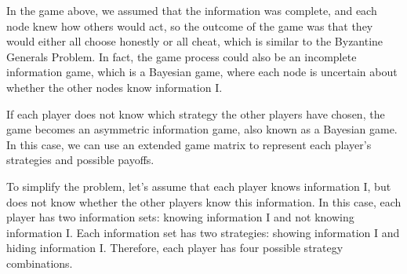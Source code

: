 \documentclass[twocolumn]{article}
\begin{document}
In the game above, we assumed that the information was complete, and each node knew how others would act, so the outcome of the game was that they would either all choose honestly or all cheat, which is similar to the Byzantine Generals Problem. In fact, the game process could also be an incomplete information game, which is a Bayesian game, where each node is uncertain about whether the other nodes know information I.

If each player does not know which strategy the other players have chosen, the game becomes an asymmetric information game, also known as a Bayesian game. In this case, we can use an extended game matrix to represent each player's strategies and possible payoffs.

To simplify the problem, let's assume that each player knows information I, but does not know whether the other players know this information. In this case, each player has two information sets: knowing information I and not knowing information I. Each information set has two strategies: showing information I and hiding information I. Therefore, each player has four possible strategy combinations.
\end{document}
